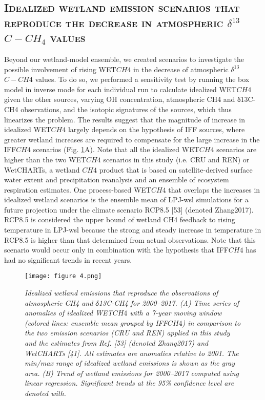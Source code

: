 \documentclass[a4paper,12pt]{article}
\begin{document}
\subsection*{\textbf{\textsc{\large{Idealized wetland emission scenarios that reproduce the decrease in atmospheric $\delta^{13}$$C-CH_{4}$ values}}}}  


\small{Beyond our wetland-model ensemble, we created scenarios to investigate the possible involvement of rising WET${CH4}$ in the decrease of atmospheric $\delta^{13}$$C-CH{4}$ values. To do so, we performed a sensitivity test by running the box model in inverse mode for each individual run to calculate idealized WET${CH4}$ given the other sources, varying OH concentration, atmospheric CH4 and δ13C-CH4 observations, and the isotopic signatures of the sources, which thus linearizes the problem. The results suggest that the magnitude of increase in idealized WET${CH4}$ largely depends on the hypothesis of IFF sources, where greater wetland increases are required to compensate for the large increase in the IFF${CH4}$ scenarios (Fig. \ref{fig4:my_label}A). Note that all the idealized WET${CH4}$ scenarios are higher than the two WET${CH4}$ scenarios in this study (i.e. CRU and REN) or WetCHARTs, a wetland ${CH4}$ product that is based on satellite-derived surface water extent and precipitation reanalysis and an ensemble of ecosystem respiration estimates. One process-based WET${CH4}$ that overlaps the increases in idealized wetland scenarios is the ensemble mean of LPJ-wsl simulations for a future projection under the climate scenario RCP8.5 [53] (denoted Zhang2017). RCP8.5 is considered the upper bound of wetland CH4 feedback to rising temperature in LPJ-wsl because the strong and steady increase in temperature in RCP8.5 is higher than that determined from actual observations. Note that this scenario would occur only in combination with the hypothesis that IFF${CH4}$ has had no significant trends in recent years.}

\newpage
\begin{figure}[H]
    \caption{}
    \texttt{[image: figure 4.png]}
    \label{fig4:my_label}
   
    
\textit{\scriptsize{Idealized wetland emissions that reproduce the observations of atmospheric CH4 and δ13C-CH4 for 2000–2017. (A) Time series of anomalies of idealized WET${CH4}$ with a 7-year moving window (colored lines: ensemble mean grouped by IFF${CH4}$) in comparison to the two emission scenarios (CRU and REN) applied in this study and the estimates from Ref. [53] (denoted Zhang2017) and WetCHARTs [41]. All estimates are anomalies relative to 2001. The min/max range of idealized wetland emissions is shown as the gray area. (B) Trend of wetland emissions for 2000–2017 computed using linear regression. Significant trends at the 95\% confidence level are denoted with.}}
\end{figure}
\\
\end{document}
